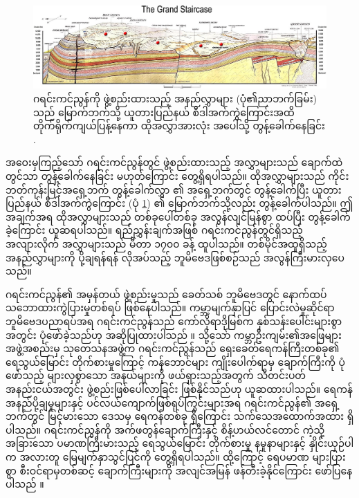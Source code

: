 \documentclass[10pt,twocolumn,letterpaper]{article}
\begin{document}
\begin{figure}
\begin{center}
\includegraphics[width=1\textwidth]{Grand_Staircase-big.jpg}
\end{center}
   \caption{ဂရင်းကင်ညွန်ကို ဖွဲ့စည်းထားသည့် အနည်လွှာများ (ပုံ၏ညာဘက်ခြမ်း) သည် မြောက်ဘက်သို့ ယူတားပြည်နယ် စီဒါအက်ကွဲကြောင်းအထိ တိုက်ရိုက်ကျယ်ပြန့်နေကာ ထိုအလွှာအားလုံး အပေါ်သို့ တွန့်ခေါက်နေခြင်း \cite{50}.}
\label{fig:4}
\end{figure}

အဝေးမှကြည့်သော် ဂရင်းကင်ညွန်တွင် ဖွဲ့စည်းထားသည့် အလွှာများသည် ချောက်ထဲတွင်သာ တွန့်ခေါက်နေခြင်း မဟုတ်ကြောင်း တွေ့ရှိရပါသည်။ ထိုအလွှာများသည် ကိုင်းဘတ်ကုန်းမြင့်အရှေ့ဘက် တွန့်ခေါက်လွှာ \cite{46} ၏ အရှေ့ဘက်တွင် တွန့်ခေါက်ပြီး ယူတားပြည်နယ် စီဒါအက်ကွဲကြောင်း (ပုံ \ref{fig:4}) ၏ မြောက်ဘက်သို့လည်း တွန့်ခေါက်ပါသည်။ ဤအချက်အရ ထိုအလွှာများသည် တစ်ခုပေါ်တစ်ခု အလွန်လျင်မြန်စွာ ထပ်ပြီး တွန့်ခေါက်ခဲ့ကြောင်း ယူဆရပါသည်။ ရည်ညွှန်းချက်အဖြစ် ဂရင်းကင်ညွန်တွင်ရှိသည့် အလျားလိုက် အလွှာများသည် မီတာ ၁၇၀၀ ခန့် ထူပါသည်။ တစ်မိုင်အထူရှိသည့် အနည်လွှာများကို ပို့ချရန်ရန် လိုအပ်သည့် ဘူမိဗေဒဖြစ်စဉ်သည် အလွန်ကြီးမားလှပေသည်။

ဂရင်းကင်ညွန်၏ အမှန်တယ် ဖွဲ့စည်းမှုသည် ခေတ်သစ် ဘူမိဗေဒတွင် နောက်ထပ် သဘောထားကွဲပြားမှုတစ်ရပ် ဖြစ်နေပါသည်။ ကမ္ဘာ့မျက်နှာပြင် ပြောင်းလဲမှုဆိုင်ရာ ဘူမိဗေဒပညာရပ်အရ ဂရင်းကင်ညွန်သည် ကော်လိုရာဒိုမြစ်က နှစ်သန်းပေါင်းများစွာအတွင်း ပုံဖော်ခဲ့သည်ဟု အဆိုပြုထားပါသည် \cite{47}။ သို့သော် ကမ္ဘာဦးကျမ်း၏အဖြေများ အဖွဲ့အစည်းမှ သုတေသနအဖွဲ့က ဂရင်းကင်ညွန်သည် ရှေးခေတ်ရေကန်ကြီးတစ်ခု၏ ရေသွယ်မြောင်း တိုက်စားမှုကြောင့် ကန်ဘောင်များ ကျိုးပေါက်ရာမှ ချောက်ကြီးကို ပုံဖော်သည့် များလှစွာသော အနယ်များကို ဖယ်ရှားသည့်အတွက် သီတင်းပတ် အနည်းငယ်အတွင်း ဖွဲ့စည်းဖြစ်ပေါ်လာခြင်း ဖြစ်နိုင်သည်ဟု ယူဆထားပါသည်။ ရေကန် အနည်ပို့ချမှုများနှင့် ပင်လယ်ကျောက်ဖြစ်ရုပ်ကြွင်းများအရ ဂရင်းကင်ညွန်၏ အရှေ့ဘက်တွင် မြင့်မားသော ဒေသမှ ရေကန်တစ်ခု ရှိကြောင်း သက်သေအထောက်အထား ရှိပါသည်။ ဂရင်းကင်ညွန်ကို အက်ဖတွန်ချောက်ကြီးနှင့် စိန့်ဟယ်လင်တောင် ကဲ့သို့ အခြားသော ပမာဏကြီးမားသည့် ရေသွယ်မြောင်း တိုက်စားမှု နမူနာများနှင့် နှိုင်းယှဉ်ပါက အလားတူ မြေမျက်နှာသွင်ပြင်ကို တွေ့ရှိရပါသည်။ ထို့ကြောင့် ရေပမာဏ များပြားစွာ စီးဝင်ရာမှတစ်ဆင့် ချောက်ကြီးများကို အလျင်အမြန် ဖန်တီးခဲ့နိုင်ကြောင်း ဖော်ပြနေပါသည် \cite{48}။
\end{document}
